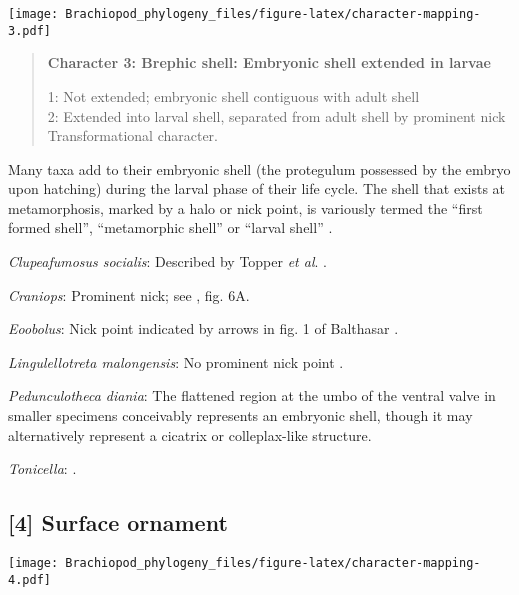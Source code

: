 \documentclass[openany]{book}
\theoremstyle{definition}
\theoremstyle{definition}
\theoremstyle{definition}
\theoremstyle{remark}
\begin{document}
\texttt{[image: Brachiopod\_phylogeny\_files/figure-latex/character-mapping-3.pdf]}

\begin{quote}
\textbf{Character 3: Brephic shell: Embryonic shell extended in larvae}

1: Not extended; embryonic shell contiguous with adult shell\\
2: Extended into larval shell, separated from adult shell by prominent
nick\\
Transformational character.
\end{quote}

Many taxa add to their embryonic shell (the protegulum possessed by the
embryo upon hatching) during the larval phase of their life cycle. The
shell that exists at metamorphosis, marked by a halo or nick point, is
variously termed the ``first formed shell'', ``metamorphic shell'' or
``larval shell'' \citep{Bassett2017Earliestontogeny}.

\hypertarget{Clupeafumosus_socialis-coding-3}{}
\emph{Clupeafumosus socialis}: Described by Topper \emph{et al}.
\citeyearpar{Topper2013Reappraisalof}.

\hypertarget{Craniops-coding-3}{}
\emph{Craniops}: Prominent nick; see \citet{Freeman1999Changesin}, fig.
6A.

\hypertarget{Eoobolus-coding-3}{}
\emph{Eoobolus}: Nick point indicated by arrows in fig. 1 of Balthasar
\citeyearpar{Balthasar2009Thebrachiopod}.

\hypertarget{Lingulellotreta_malongensis-coding-3}{}
\emph{Lingulellotreta malongensis}: No prominent nick point
\citep{Holmer1997EarlyCambrian, Li2004}.

\hypertarget{Pedunculotheca_diania-coding-3}{}
\emph{Pedunculotheca diania}: The flattened region at the umbo of the
ventral valve in smaller specimens conceivably represents an embryonic
shell, though it may alternatively represent a cicatrix or
colleplax-like structure.

\hypertarget{Tonicella-coding-3}{}
\emph{Tonicella}: \citet{Wanninger2002C}.

\subsection*{{[}4{]} Surface ornament}\label{surface-ornament}

\texttt{[image: Brachiopod\_phylogeny\_files/figure-latex/character-mapping-4.pdf]}
\end{document}
